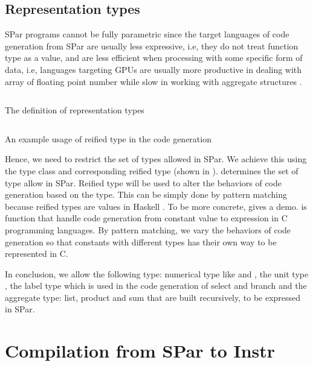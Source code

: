 \subsection{Representation types} \label{codegen:sec:repr}
SPar programs cannot be fully parametric since the target languages of code generation from SPar are usually less expressive, i.e, they do not treat function type  as a value, and are less efficient when processing with some specific form of data, i.e, languages targeting GPUs are usually more productive in dealing with array of floating point number while slow in working with aggregate structures \cite{mcdonellTypesafeRuntimeCode}. 
\begin{listing}
    \inputminted{Haskell}{codegen/repr.hs}    
    \caption{The definition of representation types}
    \label{codegen:code:repr}
\end{listing}
\begin{listing}
    \inputminted{Haskell}{codegen/const.hs} 
    \caption{An example usage of reified type in the code generation}
    \label{codegen:code:const}
\end{listing}
Hence, we need to restrict the set of types allowed in SPar. We achieve this using the type class  and corresponding reified type  (shown in ).  determines the set of type allow in SPar. Reified type  will be used to alter the behaviors of code generation based on the type. This can be simply done by pattern matching because reified types are values in Haskell \cite{ReifiedTypeHaskellWiki}. To be more concrete,  gives a demo.  is function that handle code generation from constant value to expression in C programming languages. By pattern matching, we vary the behaviors of code generation so that constants with different types has their own way to be represented in C.

In conclusion, we allow the following type: numerical type like  and , the unit type \hask{()}, the label type which is used in the code generation of select and branch and the aggregate type: list, product and sum that are built recursively, to be expressed in SPar.

\section{Compilation from SPar to Instr}
